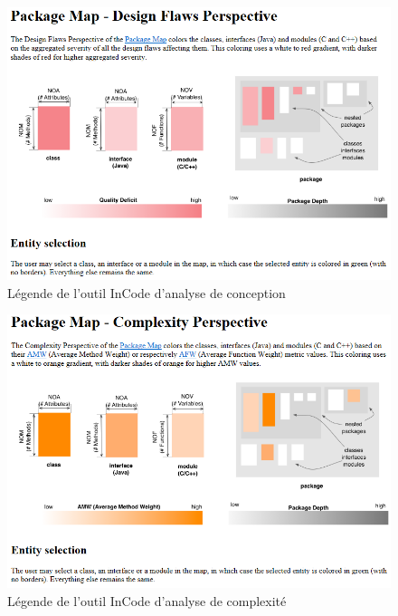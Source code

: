 \documentclass[12pt,a4paper,final]{article}
\begin{document}
\begin{figure}[ht]
	\centering
	\includegraphics[width=\textwidth]{images/InCodeDesignFlawsLegende.png}
	\caption{\label{designflawsLeg}Légende de l'outil InCode d'analyse de conception}
\end{figure}

\begin{figure}[ht]
	\centering
	\includegraphics[width=\textwidth]{images/InCodeComplexityLegende.png}
	\caption{\label{complexityLeg}Légende de l'outil InCode d'analyse de complexité}
\end{figure}
\end{document}

